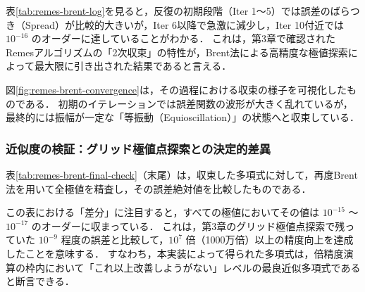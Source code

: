 

表\ref{tab:remes-brent-log}を見ると，反復の初期段階（Iter 1〜5）では誤差のばらつき（Spread）が比較的大きいが，Iter 6以降で急激に減少し，Iter 10付近では $10^{-16}$ のオーダーに達していることがわかる．
これは，第3章で確認されたRemesアルゴリズムの「2次収束」の特性が，Brent法による高精度な極値探索によって最大限に引き出された結果であると言える．

図\ref{fig:remes-brent-convergence}は，その過程における収束の様子を可視化したものである．
初期のイテレーションでは誤差関数の波形が大きく乱れているが，最終的には振幅が一定な「等振動（Equioscillation）」の状態へと収束している．

\subsubsection{近似度の検証：グリッド極値点探索との決定的差異}
表\ref{tab:remes-brent-final-check}（末尾）は，収束した多項式に対して，再度Brent法を用いて全極値を精査し，その誤差絶対値を比較したものである．

この表における「差分」に注目すると，すべての極値においてその値は $10^{-15}$ 〜 $10^{-17}$ のオーダーに収まっている．
これは，第3章のグリッド極値点探索で残っていた $10^{-9}$ 程度の誤差と比較して，$10^{7}$ 倍（1000万倍）以上の精度向上を達成したことを意味する．
すなわち，本実装によって得られた多項式は，倍精度演算の枠内において「これ以上改善しようがない」レベルの最良近似多項式であると断言できる．
